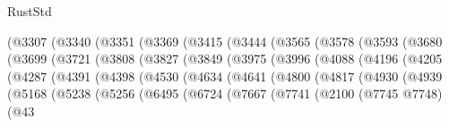 \begin{lexlean}{RustStd}
\begin{coremodule}
                  (@3307
                    (@3340
                      (@3351
                        (@3369
                          (@3415
                            (@3444
                              (@3565
                                (@3578
                                  (@3593
                                    (@3680
                                      (@3699
                                        (@3721
                                          (@3808
                                            (@3827
                                              (@3849
                                                (@3975
                                                  (@3996
                                                    (@4088
                                                      (@4196
                                                        (@4205
                                                          (@4287
                                                            (@4391
                                                              (@4398
                                                                (@4530
                                                                  (@4634
                                                                    (@4641
                                                                      (@4800
                                                                        (@4817
                                                                          (@4930
                                                                            (@4939
                                                                              (@5168
                                                                                (@5238
                                                                                  (@5256
                                                                                    (@6495
                                                                                      (@6724
                                                                                        (@7667
                                                                                          (@7741
                                                                                            (@2100
                                                                                              (@7745
                                                                                                @7748)
                                                                                              (@43

\end{coremodule}
\end{lexlean}

